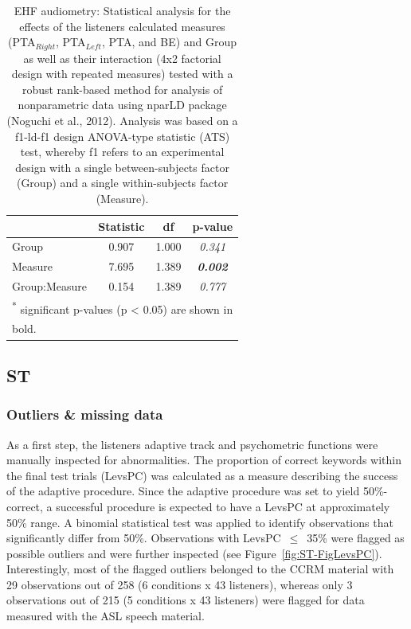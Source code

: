 \documentclass[a4paper, twoside]{templates/ociamthesis}
\begin{document}
\begin{table}

\caption{\label{tab:EHF-PTATabnparLD}EHF audiometry: Statistical analysis for the effects of the listeners calculated measures (PTA$_{Right}$, PTA$_{Left}$, PTA, and BE) and Group as well as their interaction (4x2 factorial design with repeated measures) tested with a robust rank-based method for analysis of nonparametric data using nparLD package (Noguchi et al., 2012). Analysis was based on a f1-ld-f1 design ANOVA-type statistic (ATS) test, whereby f1 refers to an experimental design with a single between-subjects factor (Group) and a single within-subjects factor (Measure).}
\centering
\begin{tabular}[t]{lcc>{}c}
\toprule
  & Statistic & df & p-value\\
\midrule
Group & 0.907 & 1.000 & \em{0.341}\\
Measure & 7.695 & 1.389 & \em{\textbf{0.002}}\\
Group:Measure & 0.154 & 1.389 & \em{0.777}\\
\bottomrule
\multicolumn{4}{l}{\textsuperscript{*} significant p-values (p < 0.05) are shown in}\\
\multicolumn{4}{l}{bold.}\\
\end{tabular}
\end{table}

\hypertarget{st}{%
\subsection{ST}\label{st}}

\hypertarget{outliers-missing-data}{%
\subsubsection*{Outliers \& missing data}\label{outliers-missing-data}}

As a first step, the listeners adaptive track and psychometric functions were manually inspected for abnormalities. The proportion of correct keywords within the final test trials (LevsPC) was calculated as a measure describing the success of the adaptive procedure. Since the adaptive procedure was set to yield 50\%-correct, a successful procedure is expected to have a LevsPC at approximately 50\% range. A binomial statistical test was applied to identify observations that significantly differ from 50\%. Observations with LevsPC~\(\leq\)~35\% were flagged as possible outliers and were further inspected (see Figure~\ref{fig:ST-FigLevsPC}). Interestingly, most of the flagged outliers belonged to the CCRM material with 29 observations out of 258 (6 conditions x 43 listeners), whereas only 3 observations out of 215 (5 conditions x 43 listeners) were flagged for data measured with the ASL speech material.\\
\end{document}

